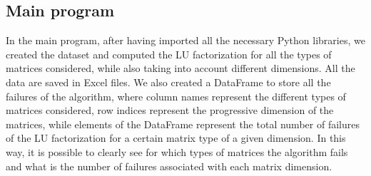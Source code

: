 \documentclass[a4paper,11pt]{article}
\begin{document}
\subsection{Main program}\label{subsect:Main_Program}
In the main program, after having imported all the necessary Python libraries, we created the dataset and computed the LU factorization for all the types of matrices considered, while also taking into account different dimensions. All the data are saved in Excel files. We also created a DataFrame to store all the failures of the algorithm, where column names represent the different types of matrices considered, row indices represent the progressive dimension of the matrices, while elements of the DataFrame represent the total number of failures of the LU factorization for a certain matrix type of a given dimension. In this way, it is possible to clearly see for which types of matrices the algorithm fails and what is the number of failures associated with each matrix dimension.
\end{document}
